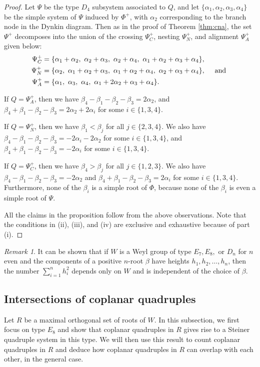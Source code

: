 \documentclass[11pt]{amsart}
\theoremstyle{plain}
\theoremstyle{definition}
\theoremstyle{remark}
\newtheorem{rmk}[theorem]{Remark}
\numberwithin{equation}{subsection}
\newcommand{\al}{\alpha}
\newcommand{\be}{\beta}
\newcommand{\posroots}{\Phi^+}
\begin{document}
\begin{proof}
Let $\Psi$ be the type $D_4$ subsystem associated to $Q$, and let $\{\al_1,
\al_2, \al_3, \al_4\}$ be the simple system of $\Psi$ induced by $\posroots$,
with $\al_2$ corresponding to the branch node in the Dynkin diagram.  Then as in
the proof of Theorem \ref{thm:cna}, the set $\Psi^+$ decomposes into the union
of the crossing $\Psi^+_C$, nesting $\Psi^+_N$, and alignment $\Psi^+_A$ given
below:
\begin{align*} \Psi^+_C &= \{\al_1 + \al_2, \ \al_2 + \al_3, \ \al_2 + \al_4, \
      \al_1 + \al_2 + \al_3 + \al_4\}, \\ \Psi^+_N &= \{\al_2, \ \al_1 + \al_2 +
      \al_3, \ \al_1 + \al_2 + \al_4, \ \al_2 + \al_3 + \al_4\}, \quad \text{\
      and\ }\\ \Psi^+_A &= \{\al_1, \ \al_3, \ \al_4, \ \al_1 + 2\al_2 + \al_3 +
      \al_4\} .\end{align*}

If $Q=\Psi^+_A$, then we have $\be_4 - \be_1 - \be_2 - \be_3 = 2\al_2$, and
$\be_4 + \be_1 - \be_2 - \be_3 = 2\al_2 + 2\al_i$ for some $i \in \{1, 3, 4\}$.

If $Q=\Psi^+_N$, then we have $\be_1 < \be_j$ for all $j \in \{2, 3, 4\}$. We
also have $\be_4 - \be_1 - \be_2 - \be_3 = -2\al_i - 2\al_2$ for some $i \in
\{1, 3, 4\}$, and $\be_4 + \be_1 - \be_2 - \be_3 = -2\al_i$ for some $i \in \{1,
3, 4\}$.

If $Q=\Psi^+_C$, then we have $\be_4 > \be_j$ for all $j \in \{1, 2, 3\}$. We
also have $\be_4 - \be_1 - \be_2 - \be_3 = -2\al_2$ and $\be_4 + \be_1 - \be_2 -
\be_3 = 2\al_i$ for some $i \in \{1, 3, 4\}$.  Furthermore, none of the $\be_i$
is a simple root of $\Phi$, because none of the $\be_i$ is even a simple root of
$\Psi$.

All the claims in the proposition follow from the above observations. Note that
the conditions in (ii), (iii), and (iv) are exclusive and exhaustive because of
part (i).
\end{proof}

\begin{rmk}\label{rmk:squaresum}
    It can be shown that if $W$ is a Weyl group of type $E_7, E_8,$ or $D_n$ for
    $n$ even and the components of a positive $n$-root $\beta$ have heights
    $h_1, h_2, \ldots, h_n$, then the number $\sum_{i = 1}^n h_i^2$ depends only on $W$
  and is independent of the choice of $\be$.
\end{rmk}

\subsection{Intersections of coplanar quadruples}
Let $R$ be a maximal orthogonal set of roots of $W$.  In this subsection, we
first focus on type $E_8$ and show that coplanar quadruples in $R$ gives rise to
a Steiner quadruple system in this type. We will then use this result to count
coplanar quadruples in $R$ and deduce how coplanar quadruples in $R$ can overlap
with each other, in the general case.
\end{document}
